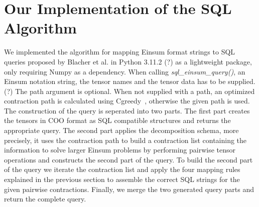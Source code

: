 \section{Our Implementation of the SQL Algorithm}
We implemented the algorithm for mapping Einsum format strings to SQL queries proposed by Blacher 
et al. in Python 3.11.2 (?) as a lightweight package, only requiring Numpy as a dependency. When
calling \textit{sql\_einsum\_query()}, an Einsum notation string, the tensor names and the tensor 
data has to be supplied. (?) The path argument is optional. When not supplied with a path, an 
optimized contraction path is calculated using Cgreedy~\cite{cgreedy}, otherwise the given path is 
used. The construction of the query is seperated into two parts. The first part creates the tensors 
in COO format as SQL compatible structures and returns the appropriate query. The second part 
applies the decomposition schema, more precisely, it uses the contraction path to build a 
contraction list containing the information to solve larger Einsum problems by performing 
pairwise tensor operations and constructs the second part of the query. To build the second part 
of the query we iterate the contraction list and apply the four mapping rules explained in the 
previous section to assemble the correct SQL strings for the given pairwise contractions. 
Finally, we merge the two generated query parts and return the complete query.
